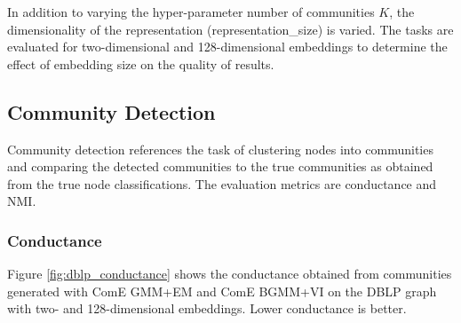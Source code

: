 \documentclass[conference]{IEEEtran}
\begin{document}
In addition to varying the hyper-parameter number of communities $K$, the dimensionality of the representation (representation\_size) is varied. The tasks are evaluated for two-dimensional and 128-dimensional embeddings to determine the effect of embedding size on the quality of results.


\subsection{Community Detection}

Community detection references the task of clustering nodes into communities and comparing the detected communities to the true communities as obtained from the true node classifications. The evaluation metrics are conductance and NMI.


\subsubsection{Conductance}

Figure \ref{fig:dblp_conductance} shows the conductance obtained from communities generated with ComE GMM+EM and ComE BGMM+VI on the DBLP graph with two- and 128-dimensional embeddings. Lower conductance is better.
\end{document}

